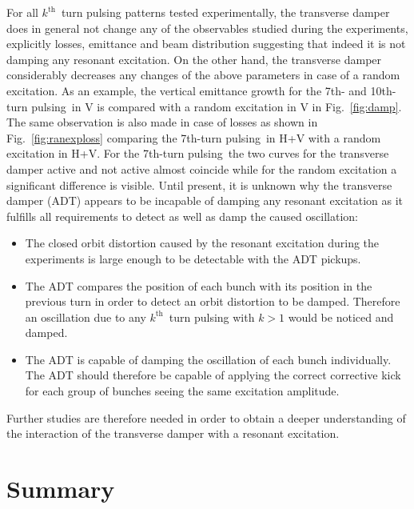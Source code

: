 \documentclass[%
 reprint,
 amsmath,amssymb,
 aps,
prstab,
longbibliography
]{revtex4-1}
\newcommand{\seventhtp}{7th-turn pulsing}
\newcommand{\tenthtp}{10th-turn pulsing}
\begin{document}
For all $k^{\mathrm{th}}$~turn pulsing patterns tested experimentally,
the transverse damper does in general not change any of the
observables studied during the experiments, explicitly losses,
emittance and beam distribution suggesting that indeed it is not
damping any resonant excitation. On the other hand, the transverse
damper considerably decreases any changes of the above parameters in
case of a random excitation. As an example, the vertical emittance
growth for the 7th- and \tenthtp\ in V is compared with a random excitation in V in Fig.~\ref{fig:damp}. The same observation is also made in case of losses as shown in Fig.~\ref{fig:ranexploss} comparing the \seventhtp\ in H+V with a random excitation in H+V. For the \seventhtp\ the two curves for the transverse damper active and not active almost coincide while for the random excitation a significant difference is visible. Until present, it is unknown why the transverse damper (ADT) appears to be incapable of damping any resonant excitation as it fulfills all requirements to detect as well as damp the caused oscillation:
\begin{itemize}
	\item The closed orbit distortion caused by the resonant excitation during the experiments is large enough to be detectable with the ADT pickups.
	\item The ADT compares the position of each bunch with its position in the previous turn in order to detect an orbit distortion to be damped. Therefore an oscillation due to any $k^{\mathrm{th}}$~turn pulsing with $k>1$ would be noticed and damped.
	\item The ADT is capable of damping the oscillation of each bunch individually. The ADT should therefore be capable of applying the correct corrective kick for each group of bunches seeing the same excitation amplitude.
\end{itemize}
Further studies are therefore needed in order to obtain a deeper understanding of the interaction of the transverse damper with a resonant excitation.

\section{Summary}
\label{sec:sum}
\end{document}
